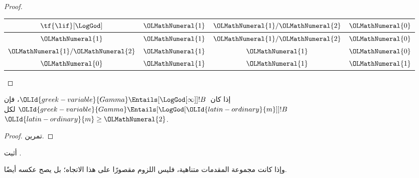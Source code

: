 \documentclass[../../../include/open-logic-section]{subfiles}
\begin{document}
\begin{proof}
\begin{center}
    \quad
    \begin{tabular}{c|ccc}
      $\tf{\lif}[\LogGod]$ & ${\OLMathNumeral{1}}$ & ${\OLMathNumeral{1}}/{\OLMathNumeral{2}}$ & ${\OLMathNumeral{0}}$ \\
      \hline
      ${\OLMathNumeral{1}}$ & ${\OLMathNumeral{1}}$ & ${\OLMathNumeral{1}}/{\OLMathNumeral{2}}$ & ${\OLMathNumeral{0}}$ \\
      ${\OLMathNumeral{1}}/{\OLMathNumeral{2}}$ & ${\OLMathNumeral{1}}$ & ${\OLMathNumeral{1}}$ & ${\OLMathNumeral{0}}$  \\
      ${\OLMathNumeral{0}}$ & ${\OLMathNumeral{1}}$ & ${\OLMathNumeral{1}}$ & ${\OLMathNumeral{1}}$
    \end{tabular}
  \end{center}
\end{proof}

\begin{prop}
  إذا كان~${\OLId{greek-variable}{Gamma}} \Entails[\LogGod[\infty]] !B$، فإن
  ${\OLId{greek-variable}{Gamma}} \Entails[\LogGod[{\OLId{latin-ordinary}{m}}]] !B$ لكل~${\OLId{latin-ordinary}{m}} \ge {\OLMathNumeral{2}}$.
\end{prop}

\begin{proof}
  تمرين.
\end{proof}

\begin{prob}
  أثبت .
\end{prob}

وإذا كانت مجموعة المقدمات متناهية، فليس اللزوم مقصورًا على هذا الاتجاه؛
بل يصح عكسه أيضًا.
\end{document}
